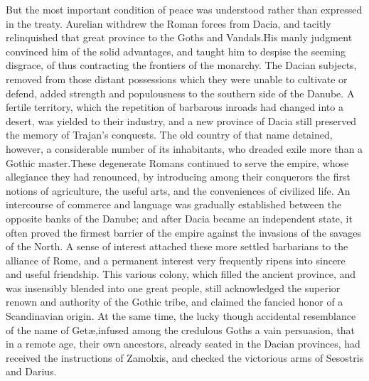 But the most important condition of peace was understood rather
than expressed in the treaty. Aurelian withdrew the Roman forces
from Dacia, and tacitly relinquished that great province to the
Goths and Vandals.\footnotemark[22] His manly judgment convinced him of the
solid advantages, and taught him to despise the seeming disgrace,
of thus contracting the frontiers of the monarchy. The Dacian
subjects, removed from those distant possessions which they were
unable to cultivate or defend, added strength and populousness to
the southern side of the Danube. A fertile territory, which the
repetition of barbarous inroads had changed into a desert, was
yielded to their industry, and a new province of Dacia still
preserved the memory of Trajan’s conquests. The old country of
that name detained, however, a considerable number of its
inhabitants, who dreaded exile more than a Gothic master.\footnotemark[23]
These degenerate Romans continued to serve the empire, whose
allegiance they had renounced, by introducing among their
conquerors the first notions of agriculture, the useful arts, and
the conveniences of civilized life. An intercourse of commerce
and language was gradually established between the opposite banks
of the Danube; and after Dacia became an independent state, it
often proved the firmest barrier of the empire against the
invasions of the savages of the North. A sense of interest
attached these more settled barbarians to the alliance of Rome,
and a permanent interest very frequently ripens into sincere and
useful friendship. This various colony, which filled the ancient
province, and was insensibly blended into one great people, still
acknowledged the superior renown and authority of the Gothic
tribe, and claimed the fancied honor of a Scandinavian origin. At
the same time, the lucky though accidental resemblance of the
name of Getæ,\footnotemark[231] infused among the credulous Goths a vain
persuasion, that in a remote age, their own ancestors, already
seated in the Dacian provinces, had received the instructions of
Zamolxis, and checked the victorious arms of Sesostris and
Darius.\footnotemark[24]



